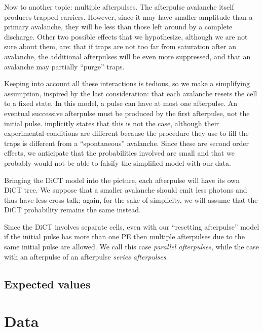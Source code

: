Now to another topic: multiple afterpulses. The afterpulse avalanche itself
produces trapped carriers. However, since it may have smaller amplitude than a
primary avalanche, they will be less than those left around by a complete
discharge. Other two possible effects that we hypothesize, although we are not
sure about them, are: that if traps are not too far from saturation after an
avalanche, the additional afterpulses will be even more suppressed, and that an
avalanche may partially ``purge'' traps.

Keeping into account all these interactions is tedious, so we make a
simplifying assumption, inspired by the last consideration: that each avalanche
resets the cell to a fixed state. In this model, a pulse can have at most one
afterpulse. An eventual successive afterpulse must be produced by the first
afterpulse, not the initial pulse. \cite{cova1991} implicitly states that this
is not the case, although their experimental conditions are different because
the procedure they use to fill the traps is different from a ``spontaneous''
avalanche. Since these are second order effects, we anticipate that the
probabilities involved are small and that we probably would not be able to
falsify the simplified model with our data.

Bringing the DiCT model into the picture, each afterpulse will have its own
DiCT tree. We suppose that a smaller avalanche should emit less photons and
thus have less cross talk; again, for the sake of simplicity, we will assume
that the DiCT probability remains the same instead.

Since the DiCT involves separate cells, even with our ``resetting afterpulse''
model if the initial pulse has more than one PE then multiple afterpulses due
to the same initial pulse are allowed. We call this case \emph{parallel
afterpulses}, while the case with an afterpulse of an afterpulse \emph{series
afterpulses}.

\subsection{Expected values}


\section{Data}

